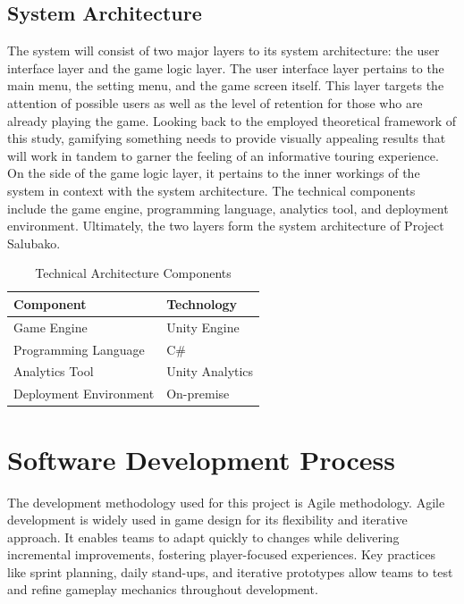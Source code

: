 \documentclass{research}
\begin{document}
\subsection{System Architecture}

The system will consist of two major layers to its system architecture: the user
interface layer and the game logic layer. The user interface layer pertains to the main
menu, the setting menu, and the game screen itself. This layer targets the attention of
possible users as well as the level of retention for those who are already playing the
game. Looking back to the employed theoretical framework of this study, gamifying
something needs to provide visually appealing results that will work in tandem to garner
the feeling of an informative touring experience. On the side of the game logic layer,
it pertains to the inner workings of the system in context with the system architecture.
The technical components include the game engine, programming language, analytics tool,
and deployment environment. Ultimately, the two layers form the system architecture of
Project Salubako.

\begin{table}[h!]
\centering
\caption{Technical Architecture Components}
\label{tab:system_architecture}
\begin{tabular}{ll}
\toprule
\textbf{Component}          & \textbf{Technology}  \\
\midrule
Game Engine                 & Unity Engine         \\
Programming Language        & C\#                  \\
Analytics Tool              & Unity Analytics      \\
Deployment Environment      & On-premise           \\
\bottomrule
\end{tabular}
\end{table}

\section{Software Development Process}

The development methodology used for this project is Agile methodology. Agile
development is widely used in game design for its flexibility and iterative approach.
It enables teams to adapt quickly to changes while delivering incremental improvements,
fostering player-focused experiences. Key practices like sprint planning, daily
stand-ups, and iterative prototypes allow teams to test and refine gameplay mechanics
throughout development.
\end{document}
